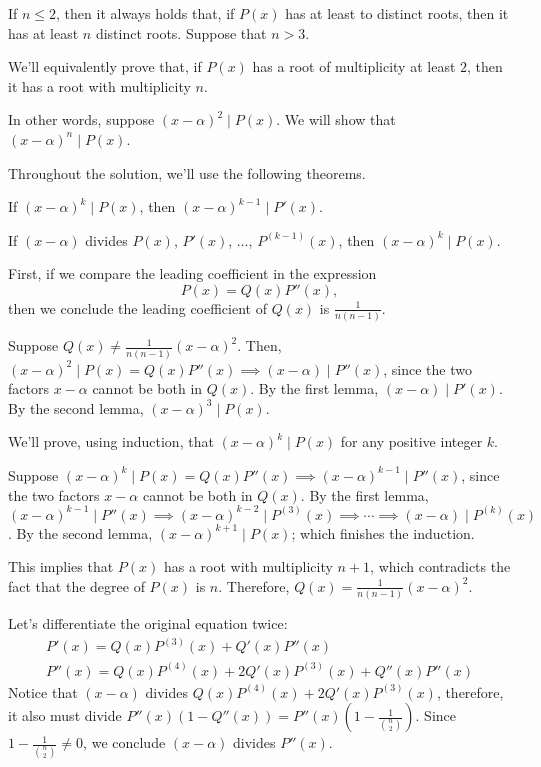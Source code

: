 \begin{sol}
	If \(n \leq 2\), then it always holds that, if \(P(x)\) has at least to distinct roots, then it has at least \(n\) distinct roots. Suppose that \(n > 3\).

	We'll equivalently prove that, if \(P(x)\) has a root of multiplicity at least \(2\), then it has a root with multiplicity \(n\).

	In other words, suppose \((x - \alpha)^2 \mid P(x)\). We will show that \((x - \alpha)^n \mid P(x)\).

	Throughout the solution, we'll use the following theorems.
	\begin{lem}
		If \((x - \alpha)^k \mid P(x)\), then \((x-\alpha)^{k-1} \mid P'(x)\).
	\end{lem}
	\begin{lem}
		If \((x-\alpha)\) divides \(P(x)\), \(P'(x)\),  \(\dots\), \(P^{(k-1)}(x)\), then \((x-\alpha)^k \mid P(x)\).
	\end{lem}

	First, if we compare the leading coefficient in the expression \[
		P(x) = Q(x)P''(x),
	\]
	then we conclude the leading coefficient of \(Q(x)\) is  \(\frac{1}{n(n-1)}\).

	Suppose  \(Q(x) \neq \frac{1}{n(n-1)}(x-\alpha)^2\). Then, \((x-\alpha)^2 \mid P(x) = Q(x) P''(x) \implies (x - \alpha) \mid P''(x)\), since the two factors \(x - \alpha\) cannot be both in \(Q(x)\). By the first lemma, \((x - \alpha) \mid P'(x)\). By the second lemma, \((x - \alpha)^3 \mid P(x)\).

	We'll prove, using induction, that \((x-\alpha)^k \mid P(x)\) for any positive integer \(k\).

	Suppose \((x-\alpha)^k \mid P(x) = Q(x) P''(x) \implies (x - \alpha)^{k-1} \mid P''(x)\), since the two factors \(x - \alpha\) cannot be both in \(Q(x)\). By the first lemma, \((x - \alpha)^{k-1} \mid P''(x) \implies (x - \alpha)^{k-2} \mid P^{(3)}(x) \implies \cdots \implies (x - \alpha) \mid P^{(k)}(x)\). By the second lemma, \((x - \alpha)^{k+1} \mid P(x)\); which finishes the induction.

	This implies that \(P(x)\) has a root with multiplicity \(n+1\), which contradicts the fact that the degree of \(P(x)\) is \(n\).
	Therefore, \(Q(x) = \frac{1}{n(n-1)} (x-\alpha)^2\).

	Let's differentiate the original equation twice:
	\begin{gather*}
		P'(x) = Q(x)P^{(3)}(x) + Q'(x)P''(x)\\
		P''(x) = Q(x)P^{(4)}(x) + 2Q'(x)P^{(3)}(x) + Q''(x)P''(x)
	\end{gather*}
	Notice that \((x-\alpha)\) divides \(Q(x)P^{(4)}(x) + 2Q'(x)P^{(3)}(x)\), therefore, it also must divide \(P''(x)(1 - Q''(x)) = P''(x)\left(1 - \frac{1}{\binom{n}{2}}\right)\). Since \(1 - \frac{1}{\binom{n}{2}} \neq 0\), we conclude \((x-\alpha)\) divides \(P''(x)\).


\end{sol}

